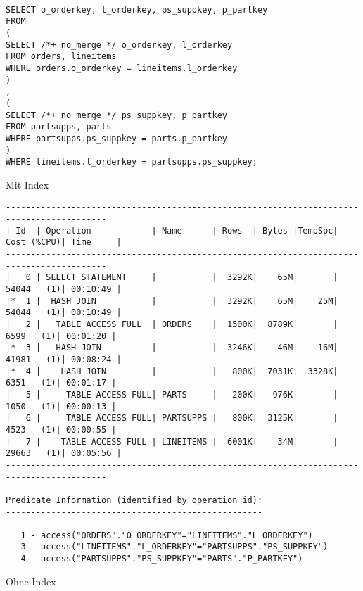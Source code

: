 \documentclass[10pt]{article}
\begin{document}
\begin{lstlisting}[style=sql]

SELECT o_orderkey, l_orderkey, ps_suppkey, p_partkey
FROM
(
SELECT /*+ no_merge */ o_orderkey, l_orderkey
FROM orders, lineitems
WHERE orders.o_orderkey = lineitems.l_orderkey
)
,
(
SELECT /*+ no_merge */ ps_suppkey, p_partkey
FROM partsupps, parts
WHERE partsupps.ps_suppkey = parts.p_partkey
)
WHERE lineitems.l_orderkey = partsupps.ps_suppkey;
\end{lstlisting}
Mit Index
\begin{lstlisting}[style=queryexecutionplan]
------------------------------------------------------------------------------------------
| Id  | Operation            | Name      | Rows  | Bytes |TempSpc| Cost (%CPU)| Time     |
------------------------------------------------------------------------------------------
|   0 | SELECT STATEMENT     |           |  3292K|    65M|       | 54044   (1)| 00:10:49 |
|*  1 |  HASH JOIN           |           |  3292K|    65M|    25M| 54044   (1)| 00:10:49 |
|   2 |   TABLE ACCESS FULL  | ORDERS    |  1500K|  8789K|       |  6599   (1)| 00:01:20 |
|*  3 |   HASH JOIN          |           |  3246K|    46M|    16M| 41981   (1)| 00:08:24 |
|*  4 |    HASH JOIN         |           |   800K|  7031K|  3328K|  6351   (1)| 00:01:17 |
|   5 |     TABLE ACCESS FULL| PARTS     |   200K|   976K|       |  1050   (1)| 00:00:13 |
|   6 |     TABLE ACCESS FULL| PARTSUPPS |   800K|  3125K|       |  4523   (1)| 00:00:55 |
|   7 |    TABLE ACCESS FULL | LINEITEMS |  6001K|    34M|       | 29663   (1)| 00:05:56 |
------------------------------------------------------------------------------------------
 
Predicate Information (identified by operation id):
---------------------------------------------------
 
   1 - access("ORDERS"."O_ORDERKEY"="LINEITEMS"."L_ORDERKEY")
   3 - access("LINEITEMS"."L_ORDERKEY"="PARTSUPPS"."PS_SUPPKEY")
   4 - access("PARTSUPPS"."PS_SUPPKEY"="PARTS"."P_PARTKEY")
\end{lstlisting}
Ohne Index
\end{document}
